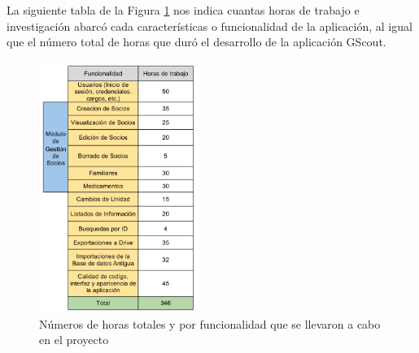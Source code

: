 


La siguiente tabla de la Figura \ref{fig:presupuesto} nos indica cuantas horas de trabajo e investigación abarcó cada características o funcionalidad de la aplicación, al igual que 
el número total de horas que duró el desarrollo de la aplicación GScout.

\begin{figure}[H]
\begin{center}
\includegraphics[width=0.47\textwidth]{images/presupuesto.jpg}
\caption{Números de horas totales y por funcionalidad que se llevaron a cabo en el proyecto}
\label{fig:presupuesto}
\end{center}
\end{figure}


